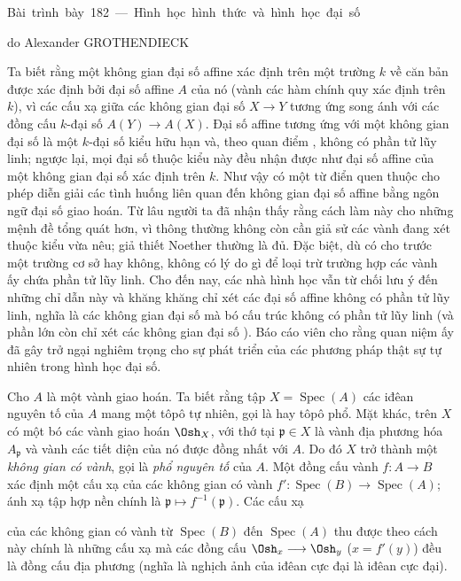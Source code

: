 \unit{Bài trình bày 182 — Hình học hình thức và hình học đại số}
%
  {do Alexander GROTHENDIECK}


Ta biết rằng một không gian đại số affine xác định trên một trường $k$ về căn
bản được xác định bởi đại số affine $A$ của nó (vành các hàm chính quy xác định
trên $k$), vì các cấu xạ giữa các không gian đại số
$X\longrightarrow Y$ tương ứng song ánh với các đồng cấu
$k$-đại số $A(Y)\longrightarrow A(X)$. Đại số affine tương ứng với một không
gian đại số là một $k$-đại số kiểu hữu hạn và, theo quan điểm
, không có phần tử lũy linh; ngược lại, mọi đại số thuộc kiểu
này đều nhận được như đại số affine của một không gian đại số xác định trên
$k$. Như vậy có một từ điển quen thuộc cho phép diễn giải các tình huống liên
quan đến không gian đại số affine bằng ngôn ngữ đại số giao hoán. Từ lâu người
ta đã nhận thấy rằng cách làm này cho những mệnh đề tổng quát hơn, vì thông
thường không còn cần giả sử các vành đang xét thuộc kiểu vừa nêu; giả thiết
Noether thường là đủ. Đặc biệt, dù có cho trước một trường cơ sở hay không,
không có lý do gì để loại trừ trường hợp các vành ấy chứa phần tử lũy linh.
Cho đến nay, các nhà hình học vẫn từ chối lưu ý đến những chỉ dẫn này và khăng
khăng chỉ xét các đại số affine không có phần tử lũy linh, nghĩa là các không
gian đại số mà bó cấu trúc không có phần tử lũy linh (và phần lớn còn chỉ xét
các không gian đại số ). Báo cáo viên cho rằng
quan niệm ấy đã gây trở ngại nghiêm trọng cho sự phát triển của các phương
pháp thật sự tự nhiên trong hình học đại số.

Cho $A$ là một vành giao hoán. Ta biết rằng tập
$X=\operatorname{Spec}(A)$ các iđêan nguyên tố của $A$ mang một tôpô tự nhiên,
gọi là  hay tôpô phổ. Mặt khác, trên $X$ có một bó các
vành giao hoán $\Osh_X$, với thớ tại $\mathfrak p\in X$ là vành địa phương hóa
$A_{\mathfrak p}$ và vành các tiết diện của nó được đồng nhất với $A$. Do đó
$X$ trở thành một \emph{không gian có vành}, gọi là \emph{phổ nguyên tố} của
$A$. Một đồng cấu vành $f:A\longrightarrow B$ xác định một cấu xạ của các
không gian có vành
$f':\operatorname{Spec}(B)\longrightarrow\operatorname{Spec}(A)$; ánh xạ tập
hợp nền chính là $\mathfrak p\longmapsto f^{-1}(\mathfrak p)$. Các cấu xạ

của các không gian có vành từ $\operatorname{Spec}(B)$ đến
$\operatorname{Spec}(A)$ thu được theo cách này chính là những cấu xạ mà các
đồng cấu $\Osh_x\longrightarrow\Osh_y$ ($x=f'(y)$) đều là đồng cấu địa phương
(nghĩa là nghịch ảnh của iđêan cực đại là iđêan cực đại).

